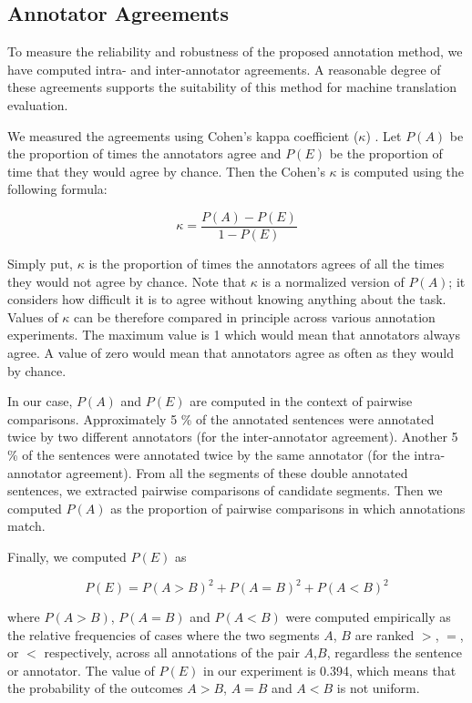 \subsection{Annotator Agreements}

To measure the reliability and robustness of the proposed annotation method, we have
computed intra- and inter-annotator agreements. A reasonable degree of these
agreements supports the suitability of this method for machine translation
evaluation.

We measured the agreements using Cohen's kappa coefficient ($\kappa$)
. Let $P(A)$ be the proportion of times the annotators agree
and $P(E)$ be the proportion of time that they would agree by chance. Then the
Cohen's $\kappa$ is computed using the following formula:

\begin{equation*}
    \kappa = \frac{P(A)-P(E)}{1-P(E)}
\end{equation*}

\noindent Simply put, $\kappa$ is the proportion of times the annotators agrees
of all the times they would not agree by chance. Note that $\kappa$ is a
normalized version of $P(A)$; it considers how difficult it is to agree without
knowing anything about the task.  Values of $\kappa$ can be therefore compared
in principle across various annotation experiments. The maximum value is 1
which would mean that annotators always agree.  A value of zero would mean that
annotators agree as often as they would by chance.

In our case, $P(A)$ and $P(E)$ are computed in the context of pairwise comparisons.
Approximately 5 \% of the annotated sentences were annotated twice by two
different annotators (for the inter-annotator agreement).  Another 5 \% of the
sentences were annotated twice by the same annotator (for the intra-annotator
agreement). From all the segments of these double annotated sentences, we
extracted pairwise comparisons of candidate segments. Then we computed $P(A)$
as the proportion of pairwise comparisons in which annotations match.

Finally, we computed $P(E)$ as 

\begin{equation*}
    P(E) = P(A>B)^2 + P(A=B)^2 + P(A<B)^2
\end{equation*}

\noindent where $P(A>B)$, $P(A=B)$ and $P(A<B)$ were computed empirically as
the relative frequencies of cases where the two segments $A$, $B$ are ranked
$>$, $=$, or $<$ respectively, across all annotations of the pair $A$,$B$,
regardless the sentence or annotator. The value of $P(E)$ in our experiment is
0.394, which means that the probability of the outcomes $A>B$, $A=B$ and $A<B$
is not uniform.

